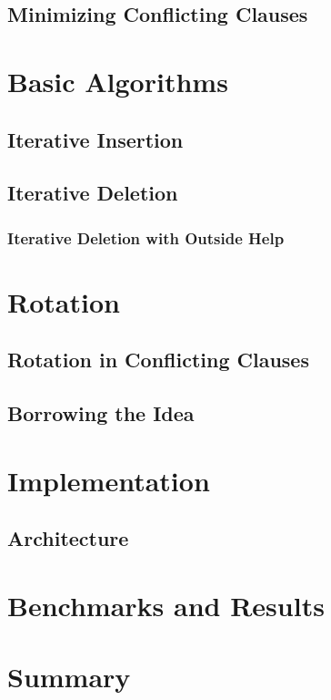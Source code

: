 \documentclass[]{article}
\begin{document}
\subsection[Similar Problem]{Minimizing Conflicting Clauses}

\section{Basic Algorithms}
\subsection{Iterative Insertion}
\subsection{Iterative Deletion}
\subsubsection{Iterative Deletion with Outside Help}

\section{Rotation}
\subsection{Rotation in Conflicting Clauses}
\subsection{Borrowing the Idea}

\section{Implementation}
\subsection{Architecture}

\section{Benchmarks and Results}

\section{Summary}
\end{document}
